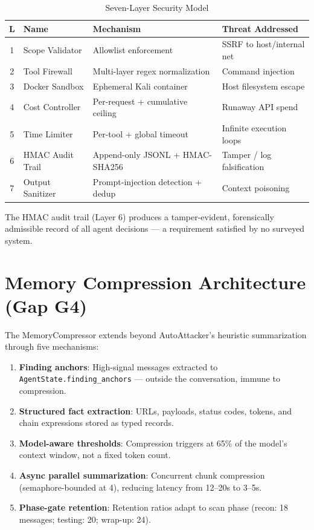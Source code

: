 \documentclass[12pt,a4paper,oneside,openany]{book}
\newcommand{\code}[1]{\texttt{#1}}
\begin{document}
\begin{table}[H]
\centering
\caption{Seven-Layer Security Model}
\label{tab:security}
\begin{tabular}{clll}
\toprule
\textbf{L} & \textbf{Name} & \textbf{Mechanism} & \textbf{Threat Addressed} \\
\midrule
1 & Scope Validator  & Allowlist enforcement & SSRF to host/internal net \\
2 & Tool Firewall    & Multi-layer regex normalization & Command injection \\
3 & Docker Sandbox   & Ephemeral Kali container & Host filesystem escape \\
4 & Cost Controller  & Per-request + cumulative ceiling & Runaway API spend \\
5 & Time Limiter     & Per-tool + global timeout & Infinite execution loops \\
6 & HMAC Audit Trail & Append-only JSONL + HMAC-SHA256 & Tamper / log falsification \\
7 & Output Sanitizer & Prompt-injection detection + dedup & Context poisoning \\
\bottomrule
\end{tabular}
\end{table}

The HMAC audit trail (Layer 6) produces a tamper-evident, forensically admissible record of all agent decisions --- a requirement satisfied by no surveyed system.

\section{Memory Compression Architecture (Gap G4)}

The MemoryCompressor extends beyond AutoAttacker's heuristic summarization through five mechanisms:

\begin{enumerate}
\item \textbf{Finding anchors}: High-signal messages extracted to \code{AgentState.finding\_anchors} — outside the conversation, immune to compression.
\item \textbf{Structured fact extraction}: URLs, payloads, status codes, tokens, and chain expressions stored as typed records.
\item \textbf{Model-aware thresholds}: Compression triggers at 65\% of the model's context window, not a fixed token count.
\item \textbf{Async parallel summarization}: Concurrent chunk compression (semaphore-bounded at 4), reducing latency from 12--20s to 3--5s.
\item \textbf{Phase-gate retention}: Retention ratios adapt to scan phase (recon: 18 messages; testing: 20; wrap-up: 24).
\end{enumerate}
\end{document}
